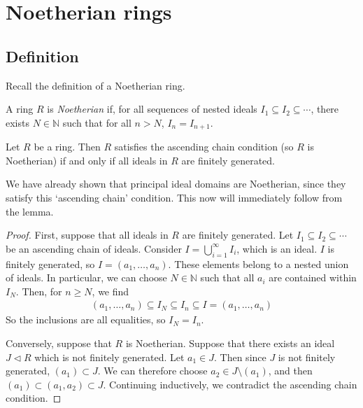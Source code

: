 \section{Noetherian rings}

\subsection{Definition}
Recall the definition of a Noetherian ring.
\begin{definition}
	A ring $R$ is \textit{Noetherian} if, for all sequences of nested ideals $I_1 \subseteq I_2 \subseteq \cdots$, there exists $N \in \mathbb N$ such that for all $n > N$, $I_n = I_{n+1}$.
\end{definition}
\begin{lemma}
	Let $R$ be a ring.
	Then $R$ satisfies the ascending chain condition (so $R$ is Noetherian) if and only if all ideals in $R$ are finitely generated.
\end{lemma}
We have already shown that principal ideal domains are Noetherian, since they satisfy this `ascending chain' condition.
This now will immediately follow from the lemma.
\begin{proof}
	First, suppose that all ideals in $R$ are finitely generated.
	Let $I_1 \subseteq I_2 \subseteq \cdots$ be an ascending chain of ideals.
	Consider $I = \bigcup_{i=1}^\infty I_i$, which is an ideal.
	$I$ is finitely generated, so $I = (a_1, \dots, a_n)$.
	These elements belong to a nested union of ideals.
	In particular, we can choose $N \in \mathbb N$ such that all $a_i$ are contained within $I_N$.
	Then, for $n \geq N$, we find
	\begin{align*}
		(a_1, \dots, a_n) \subseteq I_N \subseteq I_n \subseteq I = (a_1, \dots, a_n)
	\end{align*}
	So the inclusions are all equalities, so $I_N = I_n$.

	Conversely, suppose that $R$ is Noetherian.
	Suppose that there exists an ideal $J \triangleleft R$ which is not finitely generated.
	Let $a_1 \in J$.
	Then since $J$ is not finitely generated, $(a_1) \subset J$.
	We can therefore choose $a_2 \in J \setminus (a_1)$, and then $(a_1) \subset (a_1, a_2) \subset J$.
	Continuing inductively, we contradict the ascending chain condition.
\end{proof}

